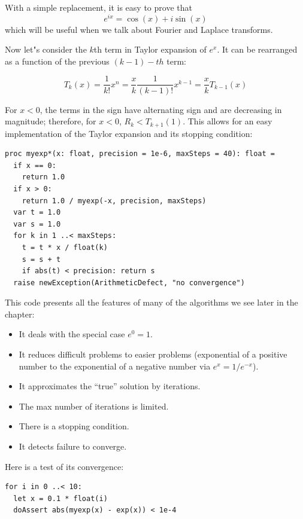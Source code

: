 \documentclass[justified, sixbynine]{tufte-book}
\def\ft{\small\tt}
\theoremstyle{plain}%
\newtheorem * {corollary}{Corollary}
\theoremstyle{definition}
\theoremstyle{remark}
\newtheorem * {remark}{Remark}
\newtheorem * {note}{Note}
\begin{document}
\begin{fullwidth}
With a simple replacement, it is easy to prove that
\begin{equation}
e^{ix} = \cos(x) + i \sin(x)
\end{equation}
which will be useful when we talk about Fourier and Laplace transforms.

Now let"s consider the $k$th term in Taylor expansion of $e^x$. It can be rearranged as a function of the previous $(k-1)-th$ term:

\begin{equation}
T_k(x) = \frac1{k!}x^n = \frac{x}{k} \frac1{(k-1)!}x^{k-1} = \frac{x}{k} T_{k-1}(x)
\end{equation}

For $x<0$, the terms in the sign have alternating sign and are decreasing in magnitude; therefore, for $x<0$, $R_k<T_{k+1}(1)$. This allows for an easy implementation of the Taylor expansion and its stopping condition:

\begin{lstlisting}[caption={in file: {\ft nlib.nim}}]
proc myexp*(x: float, precision = 1e-6, maxSteps = 40): float =
  if x == 0:
    return 1.0
  if x > 0:
    return 1.0 / myexp(-x, precision, maxSteps)
  var t = 1.0
  var s = 1.0
  for k in 1 ..< maxSteps:
    t = t * x / float(k)
    s = s + t
    if abs(t) < precision: return s
  raise newException(ArithmeticDefect, "no convergence")
\end{lstlisting}

This code presents all the features of many of the algorithms we see later in the chapter:
\begin{itemize}
\item It deals with the special case $e^0=1$.
\item It reduces difficult problems to easier problems (exponential of a positive number to the exponential of a negative number via $e^x = 1/e^{-x}$).
\item It approximates the ``true'' solution by iterations.
\item The max number of iterations is limited.
\item There is a stopping condition.
\item It detects failure to converge.
\end{itemize}

Here is a test of its convergence:

\begin{lstlisting}
for i in 0 ..< 10:
  let x = 0.1 * float(i)
  doAssert abs(myexp(x) - exp(x)) < 1e-4
\end{lstlisting}


\end{fullwidth}
\end{document}

